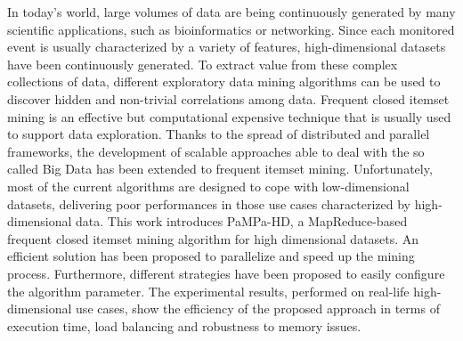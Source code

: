 

In today's world, large volumes of data are being continuously
generated by many scientific applications, such as bioinformatics or networking.
Since each monitored event is usually characterized by a variety of features,
high-dimensional datasets have been continuously generated. 
To extract value from these complex collections of data, different exploratory data mining algorithms
can be used to discover hidden and non-trivial correlations among data.
Frequent closed itemset mining is an effective but computational expensive 
technique that is usually used to support data exploration. 
Thanks to the spread of distributed and
parallel frameworks, the development of scalable approaches able to deal with
the so called Big Data has been extended to frequent itemset mining.
Unfortunately, most of the current algorithms are designed to cope with
low-dimensional datasets,
delivering poor performances in those use cases characterized by
high-dimensional data.
This work introduces PaMPa-HD, a MapReduce-based frequent closed
itemset mining algorithm for high dimensional datasets.
An efficient solution has been proposed to 
parallelize and speed up the mining process. Furthermore, different strategies have been proposed to easily configure the algorithm parameter.
The experimental results, performed on real-life high-dimensional use cases,
show the efficiency of the proposed approach in terms of execution time, load balancing and robustness to memory issues.
